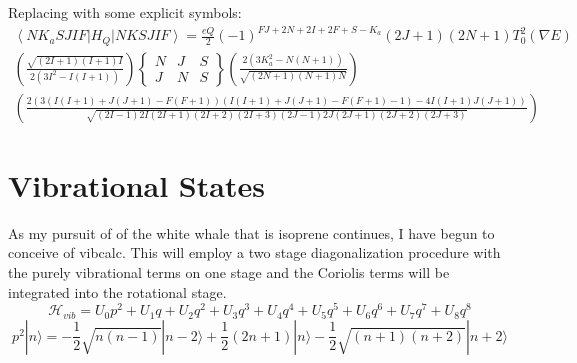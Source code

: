 \documentclass{article}
\begin{document}
Replacing with some explicit symbols:
\begin{multline}
	\left\langle NK_{a}SJIF\right|H_{Q}\left|NKSJIF\right\rangle = \frac{eQ}{2}
	(-1)^{FJ+2N+2I+2F+S-K_{a}}(2J+1)(2N+1)T_{0}^{2}(\nabla E)\\
\left(\frac{\sqrt{(2I+1)(I+1)I}}{2(3I^{2}-I(I+1))}\right)
	\begin{Bmatrix}
	N & J & S \\
	J & N & S
\end{Bmatrix}
\left(\frac{2(3K_{a}^{2}-N(N+1))}{\sqrt{(2N+1)(N+1)N}}\right)\\
\left(\frac{2(3(I(I+1)+J(J+1)-F(F+1))(I(I+1)+J(J+1)-F(F+1)-1)-4I(I+1)J(J+1))}{\sqrt{(2I-1)2I(2I+1)(2I+2)(2I+3)(2J-1)2J(2J+1)(2J+2)(2J+3)}}\right)
\end{multline}

\section{Vibrational States}
As my pursuit of of the white whale that is isoprene continues, I have begun to conceive of vibcalc. This will employ a two stage diagonalization procedure with the purely vibrational terms on one stage and the Coriolis terms will be integrated into the rotational stage.
\begin{equation}
\mathscr{H}_{vib} = U_{0}p^{2} + U_{1}q + U_{2}q^{2} + U_{3}q^{3} + U_{4}q^{4} + U_{5}q^{5} + U_{6}q^{6} + U_{7}q^{7} + U_{8}q^{8}
\end{equation}
\begin{equation}
	p^{2}|n\rangle = -\frac{1}{2}\sqrt{n(n-1)}|n-2\rangle + \frac{1}{2}(2n+1)|n\rangle - \frac{1}{2}\sqrt{(n+1)(n+2)}|n+2\rangle 
\end{equation}
\end{document}

